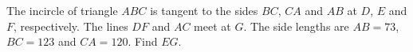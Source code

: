 The incircle of triangle $ABC$ is tangent to the sides $BC$, $CA$ and $AB$ at $D$, $E$ and $F$, respectively. The lines $DF$ and $AC$ meet at $G$. The side lengths are $AB=73$, $BC=123$ and $CA=120$. Find $EG$.
